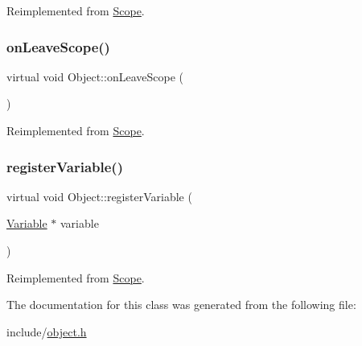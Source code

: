 Reimplemented from \hyperlink{classScope_a4a42aaa7bd341ef07a90ef51860f0a8a}{Scope}.

\mbox{\label{classObject_a54a99563b5936626d47fb1e2f0e13a9c}} 
\subsubsection{\texorpdfstring{on\+Leave\+Scope()}{onLeaveScope()}}
{\footnotesize\ttfamily virtual void Object\+::on\+Leave\+Scope (\begin{DoxyParamCaption}{ }\end{DoxyParamCaption})\hspace{0.3cm}{\ttfamily [virtual]}}



Reimplemented from \hyperlink{classScope_acff92230877eb8ff60f27c86ac56e929}{Scope}.

\mbox{\label{classObject_ad8f3631de109f50f94432ae9e1f7a130}} 
\subsubsection{\texorpdfstring{register\+Variable()}{registerVariable()}}
{\footnotesize\ttfamily virtual void Object\+::register\+Variable (\begin{DoxyParamCaption}\item[{\hyperlink{classVariable}{Variable} $\ast$}]{variable }\end{DoxyParamCaption})\hspace{0.3cm}{\ttfamily [virtual]}}



Reimplemented from \hyperlink{classScope_a4c2622adf1835753f5233869febd80d4}{Scope}.



The documentation for this class was generated from the following file\+:\begin{DoxyCompactItemize}
\item 
include/\hyperlink{object_8h}{object.\+h}\end{DoxyCompactItemize}
